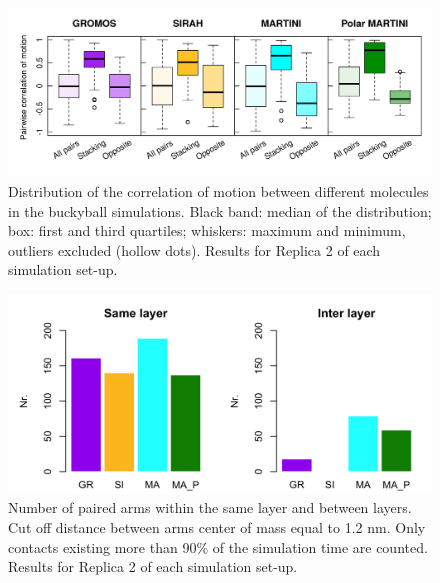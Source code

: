 \begin{figure}[t]
\centering
\includegraphics[width=0.95\linewidth]{3results_capsule/pics/R2_RKGBcorr_boxplot_all.png} 
\caption[(SI) Replica 2: Correlation of motion between molecules of the buckyball]{Distribution of the correlation of motion between different molecules in the buckyball simulations. Black band: median of the distribution; box: first and third quartiles; whiskers: maximum and minimum, outliers excluded (hollow dots). Results for Replica 2 of each simulation set-up.}
\label{fig:BTI_corr2}
\end{figure}

\begin{figure}[t!]
\centering
\includegraphics[width=0.85\linewidth]{3results_capsule/pics/R2_stAll_beta_90_R1.png}
\caption[(SI) Replica 2: Arm pairing during simulations of the buckyball]{Number of paired arms within the same layer and between layers. Cut off distance between arms center of mass equal to 1.2 nm. Only contacts existing more than 90\% of the simulation time are counted. Results for Replica 2 of each simulation set-up.}
\label{fig:BTI_beta2}
\end{figure}

